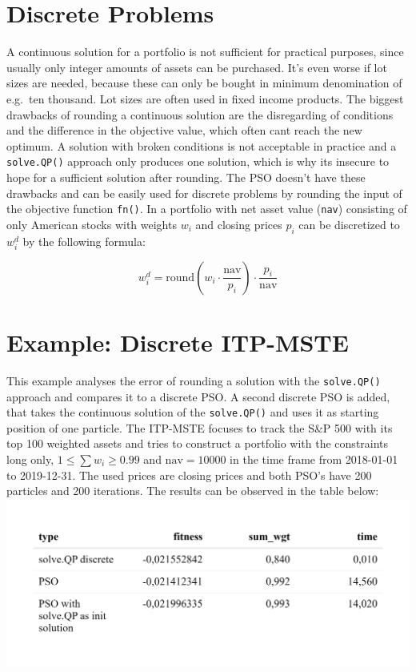 \documentclass[
  oneside]{book}
\begin{document}
\hypertarget{discrete-problems}{%
\section{Discrete Problems}\label{discrete-problems}}

A continuous solution for a portfolio is not sufficient for practical purposes, since usually only integer amounts of assets can be purchased. It's even worse if lot sizes are needed, because these can only be bought in minimum denomination of e.g.~ten thousand. Lot sizes are often used in fixed income products. The biggest drawbacks of rounding a continuous solution are the disregarding of conditions and the difference in the objective value, which often cant reach the new optimum. A solution with broken conditions is not acceptable in practice and a \texttt{solve.QP()} approach only produces one solution, which is why its insecure to hope for a sufficient solution after rounding. The PSO doesn't have these drawbacks and can be easily used for discrete problems by rounding the input of the objective function \texttt{fn()}. In a portfolio with net asset value (\texttt{nav}) consisting of only American stocks with weights \(w_i\) and closing prices \(p_i\) can be discretized to \(w_i^d\) by the following formula:

\[
  w_i^d =\text{round}(w_i \cdot \frac{\text{nav}}{p_i})\cdot \frac{p_i}{\text{nav}}
\]

\hypertarget{example-discrete-itp-mste}{%
\section{Example: Discrete ITP-MSTE}\label{example-discrete-itp-mste}}

This example analyses the error of rounding a solution with the \texttt{solve.QP()} approach and compares it to a discrete PSO. A second discrete PSO is added, that takes the continuous solution of the \texttt{solve.QP()} and uses it as starting position of one particle. The ITP-MSTE focuses to track the S\&P 500 with its top 100 weighted assets and tries to construct a portfolio with the constraints long only, \(1 \leq \textstyle\sum w_i \geq 0.99\) and \(\text{nav} = 10000\) in the time frame from 2018-01-01 to 2019-12-31. The used prices are closing prices and both PSO's have 200 particles and 200 iterations. The results can be observed in the table below:
\includegraphics{Master_Thesis_files/figure-latex/pso9-1.png}
\end{document}
